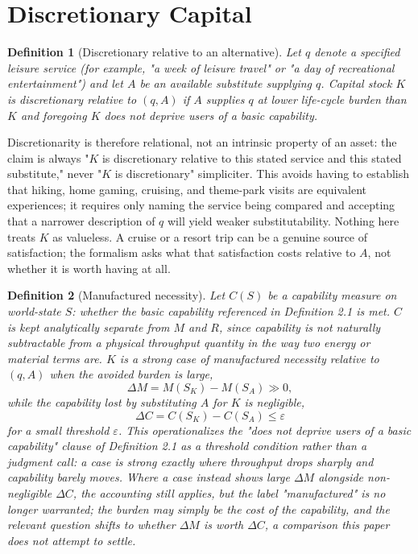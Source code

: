 \documentclass[11pt]{article}
\newtheorem{definition}{Definition}[section]
\begin{document}
\section{Discretionary Capital}

\begin{definition}[Discretionary relative to an alternative]
Let $q$ denote a specified leisure service (for example, "a week of leisure travel" or "a day of recreational entertainment") and let $A$ be an available substitute supplying $q$. Capital stock $K$ is \emph{discretionary relative to $(q,A)$} if $A$ supplies $q$ at lower life-cycle burden than $K$ and foregoing $K$ does not deprive users of a basic capability.
\end{definition}

Discretionarity is therefore relational, not an intrinsic property of an asset: the claim is always "$K$ is discretionary relative to this stated service and this stated substitute," never "$K$ is discretionary" simpliciter. This avoids having to establish that hiking, home gaming, cruising, and theme-park visits are equivalent experiences; it requires only naming the service being compared and accepting that a narrower description of $q$ will yield weaker substitutability. Nothing here treats $K$ as valueless. A cruise or a resort trip can be a genuine source of satisfaction; the formalism asks what that satisfaction costs relative to $A$, not whether it is worth having at all.

\begin{definition}[Manufactured necessity]
Let $C(S)$ be a capability measure on world-state $S$: whether the basic capability referenced in Definition 2.1 is met. $C$ is kept analytically separate from $M$ and $R$, since capability is not naturally subtractable from a physical throughput quantity in the way two energy or material terms are. $K$ is a strong case of \emph{manufactured necessity} relative to $(q,A)$ when the avoided burden is large,
\[
\Delta M = M(S_K) - M(S_A) \gg 0,
\]
while the capability lost by substituting $A$ for $K$ is negligible,
\[
\Delta C = C(S_K) - C(S_A) \leq \varepsilon
\]
for a small threshold $\varepsilon$. This operationalizes the "does not deprive users of a basic capability" clause of Definition 2.1 as a threshold condition rather than a judgment call: a case is strong exactly where throughput drops sharply and capability barely moves. Where a case instead shows large $\Delta M$ alongside non-negligible $\Delta C$, the accounting still applies, but the label "manufactured" is no longer warranted; the burden may simply be the cost of the capability, and the relevant question shifts to whether $\Delta M$ is worth $\Delta C$, a comparison this paper does not attempt to settle.
\end{definition}
\end{document}
